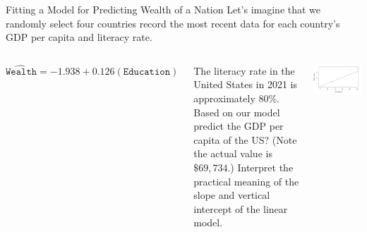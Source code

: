 \documentclass[xcolor=dvipsnames,aspectratio=169,t]{beamer}
\begin{document}
\begin{frame}{Fitting a Model for Predicting Wealth of a Nation}
  Let's imagine that we randomly select four countries record the most recent data for each country's GDP per capita and literacy rate. 

  \begin{columns}[T]
  \column{0.5\tw}
  \alert{$ \widehat{\texttt{Wealth}} = -1.938 + 0.126( \texttt{Education})$} 
  \ms

  {\small
  \bb
  \ii  The literacy rate in the United States in 2021 is approximately 80\%. Based on our model predict the GDP per capita of the US? (Note the actual value is $\$69,\!734$.)
  \ii Interpret the practical meaning of the slope and vertical intercept of the linear model.
  \ee }


  \column{0.5\tw}
  \includegraphics[width=0.95\tw]{images/fig-sample-wealth.png}
  \end{columns}
\end{frame}
\end{document}
